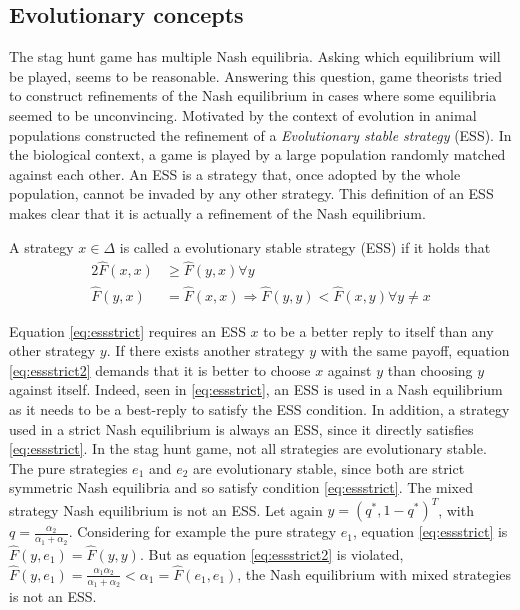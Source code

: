 \subsection{Evolutionary concepts}
The stag hunt game has multiple Nash equilibria. Asking which equilibrium
will be played, seems to be reasonable. Answering this question, game 
theorists tried to construct refinements of the Nash equilibrium in cases where 
some equilibria seemed to be unconvincing. Motivated by the context of 
evolution in animal populations \textcite{smith_lhe_1973} constructed the 
refinement of a \textit{Evolutionary stable strategy} (ESS).  
In the biological context, a game is played 
by a large population randomly matched against each other.
An ESS is a strategy that, once adopted by the whole population, cannot
be invaded by any other strategy. 
This definition of an ESS makes clear that it is actually a refinement of the 
Nash equilibrium.
\begin{mydef}
        A strategy $x \in \Delta$ is called a evolutionary stable strategy 
        (ESS) if it holds that
        \begin{alignat}{2}
                \label{eq:essstrict}
                \hat{F}(x,x) &\geq \hat{F}(y,x) \forall y \\ 
                \hat{F}(y,x) &= \hat{F}(x,x) \Rightarrow  
                \hat{F}(y,y) < \hat{F}(x,y) \forall y \neq x \label{eq:essstrict2}
        \end{alignat}
\end{mydef}
Equation \eqref{eq:essstrict}
requires an ESS $x$ to be a better reply to itself than any other strategy $y$.
If there exists another strategy $y$ with the same payoff, equation 
\eqref{eq:essstrict2} demands that it is better to choose $x$ against $y$ than
choosing $y$ against itself.
Indeed, seen in \eqref{eq:essstrict}, an ESS is used in a Nash equilibrium as 
it needs to be a best-reply to satisfy the ESS condition. In addition, 
a strategy used in a strict Nash equilibrium is always an ESS, 
since it directly satisfies 
\eqref{eq:essstrict}. 
In the stag hunt game, not all strategies are evolutionary stable.
The pure strategies $e_1$ and $e_2$ are evolutionary stable,
since both are strict symmetric Nash equilibria and so 
satisfy condition \eqref{eq:essstrict}. 
The mixed strategy Nash equilibrium is not an ESS.  
Let again $y=(q^*,1-q^*)^T$, with $q=\frac{\alpha_2}{\alpha_1+\alpha_2}$.
Considering for example the pure strategy $e_1$, 
equation \ref{eq:essstrict} is $\hat{F}(y,e_1)= \hat{F}(y,y)$.  
But as equation \eqref{eq:essstrict2} is violated,
$\hat{F}(y,e_1) = \frac{\alpha_1 \alpha_2}{\alpha_1+\alpha_2}
< \alpha_1 = \hat{F}(e_1,e_1)$, the Nash equilibrium with mixed strategies 
is not an ESS.

